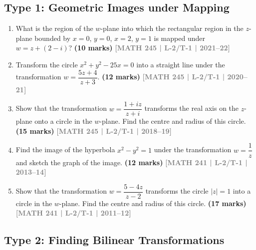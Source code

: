 \documentclass[12pt]{article}
\newcommand{\yr}[1]{\hfill\textcolor{gray}{\small\textbf{[#1]}}}
\newcommand{\mk}[1]{\textcolor{orange!70!black}{\small\textbf{(#1 marks)}}}
\begin{document}
\subsection*{Type 1: Geometric Images under Mapping}

\begin{enumerate}

\item What is the region of the $w$-plane into which the rectangular region in the $z$-plane bounded by $x=0$, $y=0$, $x=2$, $y=1$ is mapped under $w=z+(2-i)$?
\mk{10} \yr{MATH 245 | L-2/T-1 | 2021--22}

\item Transform the circle $x^{2}+y^{2}-25x=0$ into a straight line under the transformation $w=\dfrac{5z+4}{z+3}$.
\mk{12} \yr{MATH 245 | L-2/T-1 | 2020--21}

\item Show that the transformation $w=\dfrac{1+iz}{z+i}$ transforms the real axis on the $z$-plane onto a circle in the $w$-plane. Find the centre and radius of this circle.
\mk{15} \yr{MATH 245 | L-2/T-1 | 2018--19}

\item Find the image of the hyperbola $x^{2}-y^{2}=1$ under the transformation $w=\dfrac{1}{z}$ and sketch the graph of the image.
\mk{12} \yr{MATH 241 | L-2/T-1 | 2013--14}

\item Show that the transformation $w=\dfrac{5-4z}{z-2}$ transforms the circle $|z|=1$ into a circle in the $w$-plane. Find the centre and radius of this circle.
\mk{17} \yr{MATH 241 | L-2/T-1 | 2011--12}

\end{enumerate}


\subsection*{Type 2: Finding Bilinear Transformations}
\end{document}
